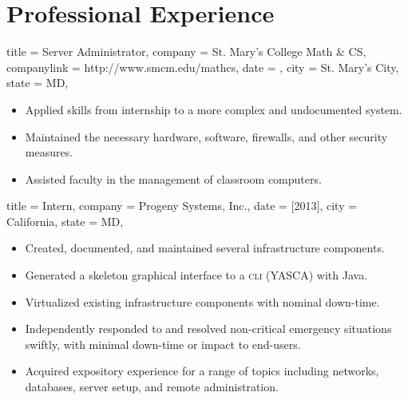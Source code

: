 \documentclass[
textout=\jobname.cv.txt,
textout preamble = preamble.txt,
]{bettercv}
\begin{document}
\section{Professional Experience}

\begin{position}
  {
    title   = Server Administrator,
    company = St. Mary's College \Dash Math \& CS,
    companylink = http://www.smcm.edu/mathcs,
    date    = ,
    city    = St. Mary's City,
    state   = MD,
  }

\begin{itemize}
\item Applied skills from internship to a more complex and undocumented system.
\item Maintained the necessary hardware, software, firewalls, and other security measures.
\item Assisted faculty in the management of classroom computers.
\end{itemize}
\end{position}

\begin{position}
  {
    title   = Intern,
    company = {Progeny Systems, Inc.},
    date    = [2013],
    city    = California,
    state   = MD,
  }

\begin{itemize}
\item Created, documented, and maintained several infrastructure components.
\item Generated a skeleton graphical interface to a \textsc{cli} (YASCA) with Java.
\item Virtualized existing infrastructure components with nominal down-time.
\item Independently responded to and resolved non-critical emergency situations swiftly, with minimal down-time or impact to end-users.
\item Acquired expository experience for a range of topics including
  networks,
  databases,
  server setup, and
  remote administration.
\end{itemize}
\end{position}
\end{document}
